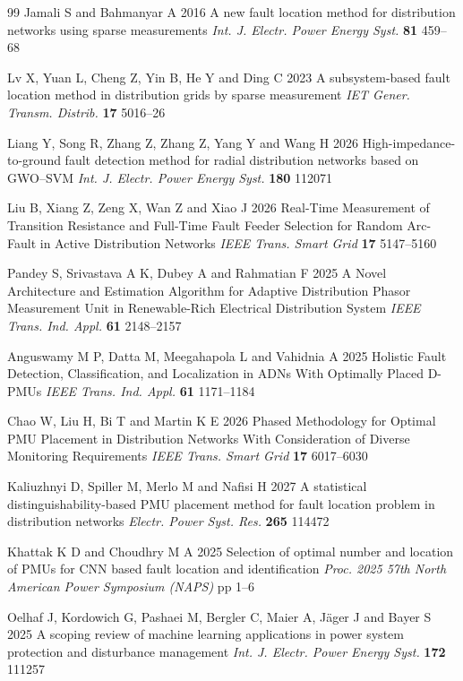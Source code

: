 \documentclass[11pt]{article}
\newcommand{\hlnew}[1]{#1}
\begin{document}
\begin{thebibliography}{99}
 Jamali S and Bahmanyar A 2016 A new fault location method for distribution networks using sparse measurements \textit{Int. J. Electr. Power Energy Syst.} \textbf{81} 459--68

 Lv X, Yuan L, Cheng Z, Yin B, He Y and Ding C 2023 A subsystem-based fault location method in distribution grids by sparse measurement \textit{IET Gener. Transm. Distrib.} \textbf{17} 5016--26

 \hlnew{Liang Y, Song R, Zhang Z, Zhang Z, Yang Y and Wang H 2026 High-impedance-to-ground fault detection method for radial distribution networks based on GWO--SVM \textit{Int. J. Electr. Power Energy Syst.} \textbf{180} 112071}

 \hlnew{Liu B, Xiang Z, Zeng X, Wan Z and Xiao J 2026 Real-Time Measurement of Transition Resistance and Full-Time Fault Feeder Selection for Random Arc-Fault in Active Distribution Networks \textit{IEEE Trans. Smart Grid} \textbf{17} 5147--5160}

 \hlnew{Pandey S, Srivastava A K, Dubey A and Rahmatian F 2025 A Novel Architecture and Estimation Algorithm for Adaptive Distribution Phasor Measurement Unit in Renewable-Rich Electrical Distribution System \textit{IEEE Trans. Ind. Appl.} \textbf{61} 2148--2157}

 \hlnew{Anguswamy M P, Datta M, Meegahapola L and Vahidnia A 2025 Holistic Fault Detection, Classification, and Localization in ADNs With Optimally Placed D-PMUs \textit{IEEE Trans. Ind. Appl.} \textbf{61} 1171--1184}

 \hlnew{Chao W, Liu H, Bi T and Martin K E 2026 Phased Methodology for Optimal PMU Placement in Distribution Networks With Consideration of Diverse Monitoring Requirements \textit{IEEE Trans. Smart Grid} \textbf{17} 6017--6030}

 \hlnew{Kaliuzhnyi D, Spiller M, Merlo M and Nafisi H 2027 A statistical distinguishability-based PMU placement method for fault location problem in distribution networks \textit{Electr. Power Syst. Res.} \textbf{265} 114472}

 \hlnew{Khattak K D and Choudhry M A 2025 Selection of optimal number and location of PMUs for CNN based fault location and identification \textit{Proc. 2025 57th North American Power Symposium (NAPS)} pp 1--6}

 \hlnew{Oelhaf J, Kordowich G, Pashaei M, Bergler C, Maier A, J\"ager J and Bayer S 2025 A scoping review of machine learning applications in power system protection and disturbance management \textit{Int. J. Electr. Power Energy Syst.} \textbf{172} 111257}


\end{thebibliography}
\end{document}
